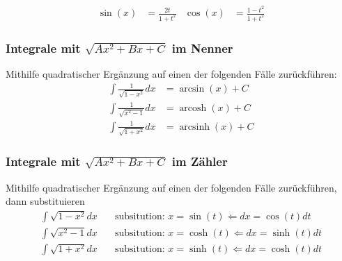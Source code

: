 \documentclass[25pt]{sciposter}
\begin{document}
\begin{multicols}{3}
\begin{align*}
\sin(x) &= \frac{2t}{1+t^2} & \cos(x) &= \frac{1-t^2}{1+t^2}
\end{align*}



\subsubsection*{Integrale mit $\sqrt{Ax^2 + Bx + C}$ im Nenner}
Mithilfe quadratischer Ergänzung auf einen der folgenden Fälle zurückführen:
\begin{align*}
\int \frac{1}{\sqrt{1-x^2}} dx &= \arcsin(x) + C\\
\int \frac{1}{\sqrt{x^2-1}} dx &= \operatorname{arcosh}(x) + C\\
\int \frac{1}{\sqrt{1+x^2}} dx &= \operatorname{arcsinh}(x) + C
\end{align*}




\subsubsection*{Integrale mit $\sqrt{Ax^2 + Bx + C}$ im Zähler}
Mithilfe quadratischer Ergänzung auf einen der folgenden Fälle zurückführen, dann substituieren
\begin{align*}
\int {\sqrt{1-x^2}} dx \quad &\text{subsitution: } x = \sin(t) \Leftarrow dx = \cos(t) dt\\
\int {\sqrt{x^2-1}} dx \quad &\text{subsitution: } x = \cosh(t) \Leftarrow dx = \sinh(t) dt \\
\int {\sqrt{1+x^2}} dx \quad &\text{subsitution: } x = \sinh(t) \Leftarrow dx = \cosh(t) dt
\end{align*}






\vfill\null
\columnbreak



\end{multicols}
\end{document}
